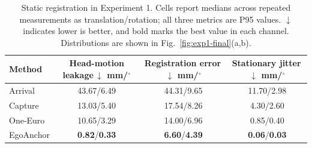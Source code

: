 \begin{table}[t]
\centering
\caption{Static registration in Experiment 1. Cells report medians across repeated measurements as translation/rotation; all three metrics are P95 values. $\downarrow$ indicates lower is better, and bold marks the best value in each channel. Distributions are shown in Fig.~\ref{fig:exp1-final}(a,b).}
\label{tab:exp1-static}
\begin{tabular}{@{}lccc@{}}
\toprule
Method & \shortstack{Head-motion\\leakage\,$\downarrow$\\mm/$^\circ$} & \shortstack{Registration\\error\,$\downarrow$\\mm/$^\circ$} & \shortstack{Stationary\\jitter\,$\downarrow$\\mm/$^\circ$} \\
\midrule
Arrival & 43.67/6.49 & 44.31/9.65 & 11.70/2.98 \\
Capture & 13.03/5.40 & 17.54/8.26 & 4.30/2.60 \\
One-Euro & 10.65/3.29 & 14.00/6.96 & 0.85/0.40 \\
EgoAnchor & \textbf{0.82}/\textbf{0.33} & \textbf{6.60}/\textbf{4.39} & \textbf{0.06}/\textbf{0.03} \\
\bottomrule
\end{tabular}
\end{table}
